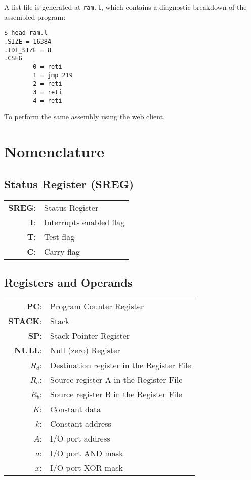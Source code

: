 \documentclass[12pt,twoside]{report}
\begin{document}
A list file is generated at \texttt{ram.l}, which contains a
diagnostic breakdown of the assembled program:

\begin{verbatim}
$ head ram.l
.SIZE = 16384
.IDT_SIZE = 8
.CSEG
        0 = reti
        1 = jmp 219
        2 = reti
        3 = reti
        4 = reti
\end{verbatim}

To perform the same assembly using the web client,


\section{Nomenclature}

\subsection{Status Register (SREG)}

\begin{tabular}{ | r | l | }
  \hline
  \textbf{SREG}: & Status Register \\
  \textbf{I}: & Interrupts enabled flag \\
  \textbf{T}: & Test flag \\
  \textbf{C}: & Carry flag \\
  \hline
\end{tabular}

\subsection{Registers and Operands}

\begin{tabular}{ | r | l | }
  \hline
  \textbf{PC}: & Program Counter Register \\
  \textbf{STACK}: & Stack \\
  \textbf{SP}: & Stack Pointer Register \\
  \textbf{NULL}: & Null (zero) Register \\
  \textbf{$R_d$}: & Destination register in the Register File \\
  \textbf{$R_a$}: & Source register A in the Register File \\
  \textbf{$R_b$}: & Source register B in the Register File \\
  \textbf{$K$}: & Constant data \\
  \textbf{$k$}: & Constant address \\
  \textbf{$A$}: & I/O port address \\
  \textbf{$a$}: & I/O port AND mask \\
  \textbf{$x$}: & I/O port XOR mask \\
  \hline
\end{tabular}
\end{document}
